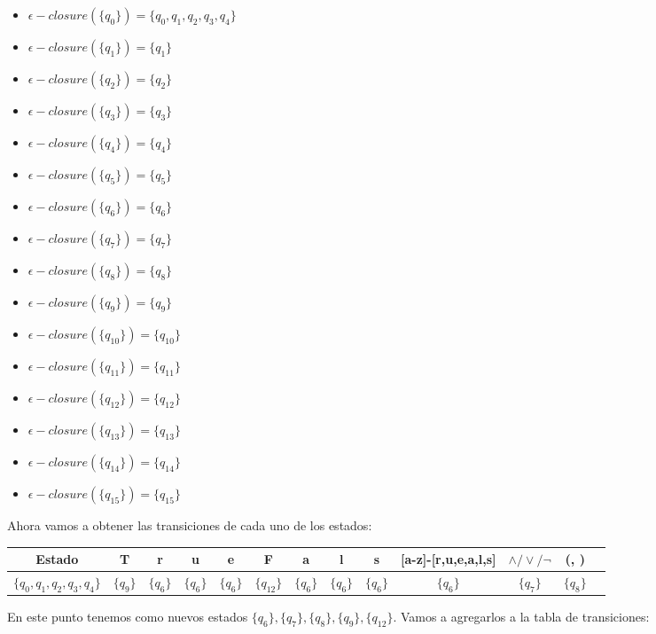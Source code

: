 \begin{itemize}
    \item $\epsilon-closure(\{q_0\}) = \{q_0, q_1, q_2, q_3, q_4\}$
    \item $\epsilon-closure(\{q_1\}) = \{q_1\}$
    \item $\epsilon-closure(\{q_2\}) = \{q_2\}$
    \item $\epsilon-closure(\{q_3\}) = \{q_3\}$
    \item $\epsilon-closure(\{q_4\}) = \{q_4\}$
    \item $\epsilon-closure(\{q_5\}) = \{q_5\}$
    \item $\epsilon-closure(\{q_6\}) = \{q_6\}$
    \item $\epsilon-closure(\{q_7\}) = \{q_7\}$
    \item $\epsilon-closure(\{q_8\}) = \{q_8\}$
    \item $\epsilon-closure(\{q_9\}) = \{q_9\}$
    \item $\epsilon-closure(\{q_{10}\}) = \{q_{10}\}$
    \item $\epsilon-closure(\{q_{11}\}) = \{q_{11}\}$
    \item $\epsilon-closure(\{q_{12}\}) = \{q_{12}\}$
    \item $\epsilon-closure(\{q_{13}\}) = \{q_{13}\}$
    \item $\epsilon-closure(\{q_{14}\}) = \{q_{14}\}$
    \item $\epsilon-closure(\{q_{15}\}) = \{q_{15}\}$
\end{itemize}

Ahora vamos a obtener las transiciones de cada uno de los estados:

\begin{table}[h!]
\centering
\begin{tabular}{|c|c|c|c|c|c|c|c|c|c|c|c|c|}
\hline
Estado &T & r & u & e & F & a & l &s &[a-z]-[r,u,e,a,l,s] &$\land/\lor/\lnot$ & (, )\\ \hline
\hline
$\{q_0, q_1, q_2, q_3, q_4\}$ & $\{q_9\}$ & $\{q_6\}$ & $\{q_6\}$ & $\{q_{6}\}$ & $\{q_{12}\}$ & $\{q_6\}$ & $\{q_6\}$ & $\{q_6\}$ & $\{q_6\}$ & $\{q_7\}$& $\{q_8\}$\\ \hline
\end{tabular}
\end{table}

En este punto tenemos como nuevos estados $\{q_6\}, \{q_7\}, \{q_8\}, \{q_9\}, \{q_{12}\}$. Vamos a agregarlos a la tabla de transiciones:

